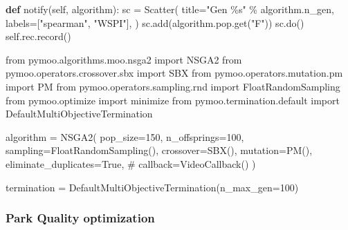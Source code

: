 \documentclass[
  authoryear,
  preprint,
  3p]{elsarticle}
\newenvironment{Shaded}{\begin{snugshade}}{\end{snugshade}}
\newcommand{\CommentTok}[1]{\textcolor[rgb]{0.37,0.37,0.37}{#1}}
\newcommand{\DecValTok}[1]{\textcolor[rgb]{0.68,0.00,0.00}{#1}}
\newcommand{\ImportTok}[1]{\textcolor[rgb]{0.00,0.46,0.62}{#1}}
\newcommand{\KeywordTok}[1]{\textcolor[rgb]{0.00,0.23,0.31}{\textbf{#1}}}
\newcommand{\NormalTok}[1]{\textcolor[rgb]{0.00,0.23,0.31}{#1}}
\newcommand{\OperatorTok}[1]{\textcolor[rgb]{0.37,0.37,0.37}{#1}}
\newcommand{\SpecialCharTok}[1]{\textcolor[rgb]{0.37,0.37,0.37}{#1}}
\newcommand{\StringTok}[1]{\textcolor[rgb]{0.13,0.47,0.30}{#1}}
\newcommand{\VariableTok}[1]{\textcolor[rgb]{0.07,0.07,0.07}{#1}}
\begin{document}
\begin{Shaded}
\begin{Highlighting}[]
    \KeywordTok{def}\NormalTok{ notify(}\VariableTok{self}\NormalTok{, algorithm):}
\NormalTok{        sc }\OperatorTok{=}\NormalTok{ Scatter(}
\NormalTok{            title}\OperatorTok{=}\StringTok{"Gen }\SpecialCharTok{\%s}\StringTok{"} \OperatorTok{\%}\NormalTok{ algorithm.n\_gen,}
\NormalTok{            labels}\OperatorTok{=}\NormalTok{[}\StringTok{"spearman"}\NormalTok{, }\StringTok{"WSPI"}\NormalTok{],}
\NormalTok{        )}
\NormalTok{        sc.add(algorithm.pop.get(}\StringTok{"F"}\NormalTok{))}
\NormalTok{        sc.do()}
        \VariableTok{self}\NormalTok{.rec.record()}
\end{Highlighting}
\end{Shaded}

\begin{Shaded}
\begin{Highlighting}[]
\ImportTok{from}\NormalTok{ pymoo.algorithms.moo.nsga2 }\ImportTok{import}\NormalTok{ NSGA2}
\ImportTok{from}\NormalTok{ pymoo.operators.crossover.sbx }\ImportTok{import}\NormalTok{ SBX}
\ImportTok{from}\NormalTok{ pymoo.operators.mutation.pm }\ImportTok{import}\NormalTok{ PM}
\ImportTok{from}\NormalTok{ pymoo.operators.sampling.rnd }\ImportTok{import}\NormalTok{ FloatRandomSampling}
\ImportTok{from}\NormalTok{ pymoo.optimize }\ImportTok{import}\NormalTok{ minimize}
\ImportTok{from}\NormalTok{ pymoo.termination.default }\ImportTok{import}\NormalTok{ DefaultMultiObjectiveTermination}

\NormalTok{algorithm }\OperatorTok{=}\NormalTok{ NSGA2(}
\NormalTok{    pop\_size}\OperatorTok{=}\DecValTok{150}\NormalTok{,}
\NormalTok{    n\_offsprings}\OperatorTok{=}\DecValTok{100}\NormalTok{,}
\NormalTok{    sampling}\OperatorTok{=}\NormalTok{FloatRandomSampling(),}
\NormalTok{    crossover}\OperatorTok{=}\NormalTok{SBX(),}
\NormalTok{    mutation}\OperatorTok{=}\NormalTok{PM(),}
\NormalTok{    eliminate\_duplicates}\OperatorTok{=}\VariableTok{True}\NormalTok{,}
    \CommentTok{\# callback=VideoCallback()}
\NormalTok{)}

\NormalTok{termination }\OperatorTok{=}\NormalTok{ DefaultMultiObjectiveTermination(n\_max\_gen}\OperatorTok{=}\DecValTok{100}\NormalTok{)}
\end{Highlighting}
\end{Shaded}

\subsubsection{Park Quality
optimization}\label{park-quality-optimization}
\end{document}
